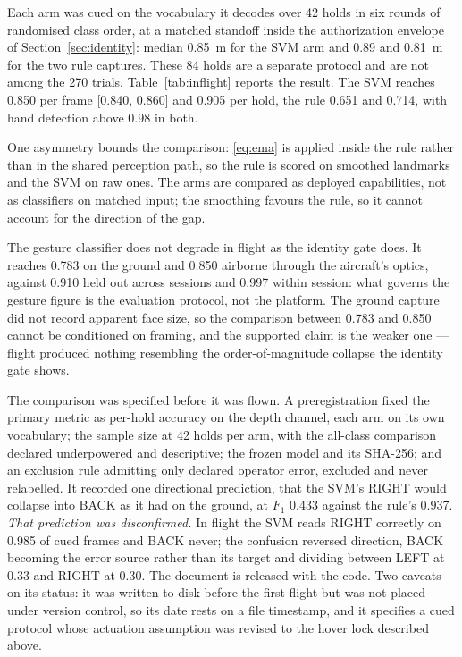 \documentclass[conference]{IEEEtran}
\begin{document}
Each arm was cued on the vocabulary it decodes over 42 holds in six rounds of
randomised class order, at a matched standoff inside the authorization envelope
of Section~\ref{sec:identity}: median 0.85~m for the SVM arm and 0.89 and
0.81~m for the two rule captures. These 84 holds are a separate protocol and are
not among the 270 trials. Table~\ref{tab:inflight} reports the result. The SVM
reaches 0.850 per frame [0.840, 0.860] and 0.905 per hold, the rule 0.651 and
0.714, with hand detection above 0.98 in both.

One asymmetry bounds the comparison: \eqref{eq:ema} is applied inside the rule
rather than in the shared perception path, so the rule is scored on smoothed
landmarks and the SVM on raw ones. The arms are compared as deployed
capabilities, not as classifiers on matched input; the smoothing favours the
rule, so it cannot account for the direction of the gap.

The gesture classifier does not degrade in flight as the identity gate does. It
reaches 0.783 on the ground and 0.850 airborne through the aircraft's optics,
against 0.910 held out across sessions and 0.997 within session: what governs
the gesture figure is the evaluation protocol, not the platform. The ground
capture did not record apparent face size, so the comparison between 0.783 and
0.850 cannot be conditioned on framing, and the supported claim is the weaker
one --- flight produced nothing resembling the order-of-magnitude collapse the
identity gate shows.

The comparison was specified before it was flown. A preregistration fixed the
primary metric as per-hold accuracy on the depth channel, each arm on its own
vocabulary; the sample size at 42 holds per arm, with the all-class comparison
declared underpowered and descriptive; the frozen model and its SHA-256; and an
exclusion rule admitting only declared operator error, excluded and never
relabelled. It recorded one directional prediction, that the SVM's RIGHT would
collapse into BACK as it had on the ground, at $F_1$ 0.433 against the rule's
0.937. \emph{That prediction was disconfirmed.} In flight the SVM reads RIGHT
correctly on 0.985 of cued frames and BACK never; the confusion reversed
direction, BACK becoming the error source rather than its target and dividing
between LEFT at 0.33 and RIGHT at 0.30. The document is released with the code.
Two caveats on its status: it was written to disk before the first flight but was
not placed under version control, so its date rests on a file timestamp, and it
specifies a cued protocol whose actuation assumption was revised to the hover
lock described above.
\end{document}
